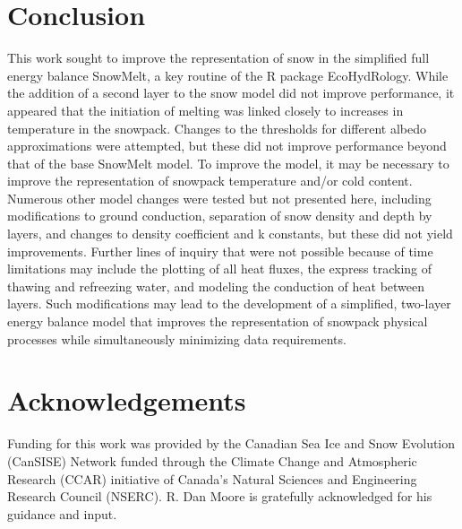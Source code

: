 \documentclass[12pt]{article}
\begin{document}
\section{Conclusion}
This work sought to improve the representation of snow in the simplified full energy balance SnowMelt, a key routine of the R package EcoHydRology.
While the addition of a second layer to the snow model did not improve performance, it appeared that the initiation of melting was linked closely to increases in temperature in the snowpack.
Changes to the thresholds for different albedo approximations were attempted, but these did not improve performance beyond that of the base SnowMelt model.
To improve the model, it may be necessary to improve the representation of snowpack temperature and/or cold content.
Numerous other model changes were tested but not presented here, including modifications to ground conduction, separation of snow density and depth by layers, and changes to density coefficient and k constants, but these did not yield improvements.
Further lines of inquiry that were not possible because of time limitations may include the plotting of all heat fluxes, the express tracking of thawing and refreezing water, and modeling the conduction of heat between layers.
Such modifications may lead to the development of a simplified, two-layer energy balance model that improves the representation of snowpack physical processes while simultaneously minimizing data requirements.


\section{Acknowledgements}
Funding for this work was provided by the Canadian Sea Ice and Snow Evolution (CanSISE) Network funded through the Climate Change and Atmospheric Research (CCAR) initiative of Canada's Natural Sciences and Engineering Research Council (NSERC).  
R. Dan Moore is gratefully acknowledged for his guidance and input.



\end{document}
